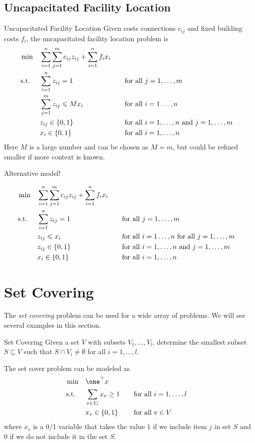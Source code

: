\subsection{Uncapacitated Facility Location}
\begin{general}{Uncapacitated Facility Location}{\npcomplete}
Given costs connections $c_{ij}$ and fixed building costs $f_i$, the uncapacitated facility location problem is 
\begin{align*}
\min \quad & \displaystyle\sum_{i=1}^n\sum_{j=1}^mc_{ij}z_{ij}+\sum_{i=1}^nf_ix_i \\
\mbox{ s.t. } \quad  & \displaystyle\sum_{i=1}^nz_{ij}=1 &&\quad \mbox{for all } j=1,\dots,m \\
& \displaystyle \sum_{j=1}^mz_{ij}\leqslant Mx_i &&\quad \mbox{for all } i=1\dots,n \\
& z_{ij}\in\{0,1\} &&\quad \mbox{for all } i=1,\dots,n \mbox{ and } j=1,\dots,m\\
& x_i\in\{0,1\} &&\quad \mbox{for all } i=1,\dots,n
\end{align*}
Here $M$ is a large number and can be chosen as $M = m$, but could be refined smaller if more context is known.
\end{general}

Alternative model!

\begin{align*}
\min \quad & \displaystyle\sum_{i=1}^n\sum_{j=1}^mc_{ij}z_{ij}+\sum_{i=1}^nf_ix_i \\
\mbox{ s.t. } \quad  & \displaystyle\sum_{i=1}^nz_{ij}=1 &&\quad \mbox{for all } j=1,\dots,m \\
& z_{ij}\leqslant x_i &&\quad \mbox{for all } i=1\dots,n \mbox{ for all } j = 1, \dots, m \\
& z_{ij}\in\{0,1\} &&\quad \mbox{for all } i=1,\dots,n \mbox{ and } j=1,\dots,m\\
& x_i\in\{0,1\} &&\quad \mbox{for all } i=1,\dots,n
\end{align*}
\newpage

\section{Set Covering}

The \emph{set covering} problem can be used for a wide array of problems.    We will see several examples in this section.

\begin{general}{Set Covering}{\npcomplete}
\label{general:set-covering}
Given a set $V$ with subsets $V_1, \dots, V_l$, determine the smallest subset $S \subseteq V$ such that 
$S \cap V_i \neq \emptyset$ for all $i=1, \dots, l$.

The set cover problem can be modeled as
\begin{align*}
\min \quad & \one^\top x\\
\st \quad  & \sum_{v \in V_i} x_v \geq 1 &&\quad \text{for all } i =1, \dots, l \\ 
& x_v \in \{0,1\} &&\quad \text{for all } v \in V
\end{align*}
where $x_v$ is a 0/1 variable that takes the value $1$ if we include item $j$ in set $S$ and $0$ if we do not include it in the set $S$.  
\end{general}


